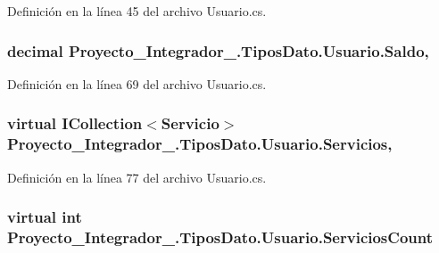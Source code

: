 Definición en la línea 45 del archivo Usuario.\-cs.

\hypertarget{class_proyecto___integrador__3_1_1_tipos_dato_1_1_usuario_ad29821993f63ad36d711b1e2b90b1be0}{
\subsubsection[{Saldo}]{\setlength{\rightskip}{0pt plus 5cm}decimal Proyecto\-\_\-\-Integrador\-\_.\-Tipos\-Dato.\-Usuario.\-Saldo\hspace{0.3cm}{\ttfamily [get]}, {\ttfamily [set]}}}\label{class_proyecto___integrador__3_1_1_tipos_dato_1_1_usuario_ad29821993f63ad36d711b1e2b90b1be0}


Definición en la línea 69 del archivo Usuario.\-cs.

\hypertarget{class_proyecto___integrador__3_1_1_tipos_dato_1_1_usuario_a95e6bba4296f208230d6374df201f24b}{
\subsubsection[{Servicios}]{\setlength{\rightskip}{0pt plus 5cm}virtual I\-Collection$<${\bf Servicio}$>$ Proyecto\-\_\-\-Integrador\-\_.\-Tipos\-Dato.\-Usuario.\-Servicios\hspace{0.3cm}{\ttfamily [get]}, {\ttfamily [set]}}}\label{class_proyecto___integrador__3_1_1_tipos_dato_1_1_usuario_a95e6bba4296f208230d6374df201f24b}


Definición en la línea 77 del archivo Usuario.\-cs.

\hypertarget{class_proyecto___integrador__3_1_1_tipos_dato_1_1_usuario_a28988ddc822fdf9d27d55cc2340ab65f}{
\subsubsection[{Servicios\-Count}]{\setlength{\rightskip}{0pt plus 5cm}virtual int Proyecto\-\_\-\-Integrador\-\_.\-Tipos\-Dato.\-Usuario.\-Servicios\-Count\hspace{0.3cm}{\ttfamily [get]}}}\label{class_proyecto___integrador__3_1_1_tipos_dato_1_1_usuario_a28988ddc822fdf9d27d55cc2340ab65f}


